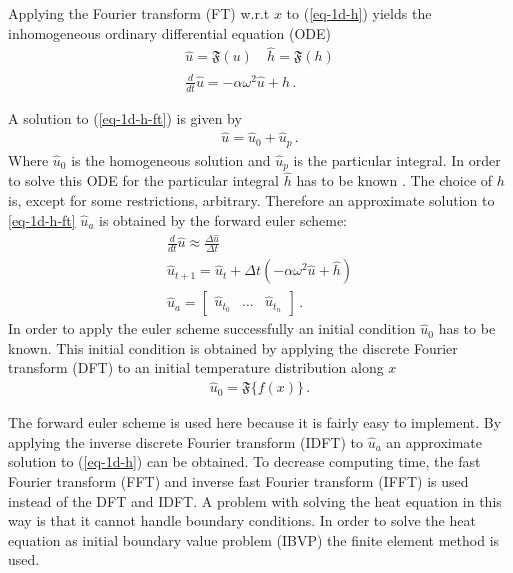 Applying the Fourier transform (FT) w.r.t \(x\) to (\ref{eq-1d-h}) yields the inhomogeneous ordinary differential equation (ODE)
\begin{gather}
\hat{u} = \mathfrak{F}(u) \quad \hat{h} = \mathfrak{F}(h) \\
\frac{d}{dt} \hat{u} = -\alpha\omega^{2}\hat{u} + \hat{h}\,. \label{eq-1d-h-ft}
\end{gather}

A solution to (\ref{eq-1d-h-ft}) is given by
\begin{gather}
\hat{u} = \hat{u}_{0} + \hat{u}_{p}\,.
\end{gather}
Where \(\hat{u}_{0}\) is the homogeneous solution and \(\hat{u}_{p}\) is the particular integral.
In order to solve this ODE for the particular integral \(\hat{h}\) has to be known \cite{Papula2015}.
The choice of \(h\) is, except for some restrictions, arbitrary.
Therefore an approximate solution to \ref{eq-1d-h-ft} \(\hat{u}_{a}\) is obtained by the forward euler scheme:
\begin{gather}
\frac{d}{dt} \hat{u} \approx \frac{\Delta \hat{u}}{\Delta t} \\
\hat{u}_{t+1} = \hat{u}_{t} + \Delta t (-\alpha\omega^{2}\hat{u} + \hat{h}) \label{eq-1d-h-es} \\
\hat{u}_{a} = \begin{bmatrix}
\hat{u}_{t_{0}} & \hdots & \hat{u}_{t_{n}}
\end{bmatrix}\,.
\end{gather}
In order to apply the euler scheme successfully an initial condition   \(\hat{u}_{0}\) has to be known. 
This initial condition is obtained by applying the discrete Fourier transform (DFT) to an initial temperature distribution along \(x\)
\begin{gather}
\hat{u}_{0} = \mathfrak{F} \{f(x)\}\,.
\end{gather} 
\cite{Gustafsson2011b}

The forward euler scheme is used here because it is fairly easy to implement.
By applying the  inverse discrete Fourier transform (IDFT) to \(\hat{u}_{a}\) an approximate solution to (\ref{eq-1d-h}) can be obtained.
To decrease computing time, the fast Fourier transform (FFT) and inverse fast Fourier transform (IFFT) is used instead of the DFT and IDFT.
A problem with solving the heat equation in this way is that it cannot handle boundary conditions.
In order to solve the heat equation as initial boundary value problem (IBVP) the finite element method is used.